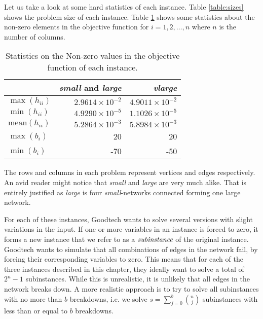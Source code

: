 Let us take a look at some hard statistics of each instance.
Table \ref{table:sizes} shows the problem size of each instance.
Table \ref{table:maxmin} shows some statistics about the non-zero elements in
the objective function for $i = 1,2,\ldots,n$ where $n$ is the number of
columns.
\begin{table}[h!]
    \centering
    \caption{Statistics on the Non-zero values in the objective function of
each instance.}

    \begin{tabular}{lrr}
      & \textit{small} and \textit{large}         & \textit{vlarge} \\\hline
    $\max(h_{ii})$      & $2.9614 \times 10^{-2}$ & $4.9011 \times 10^{-2}$ \\
    $\min(h_{ii})$      & $4.9290 \times 10^{-5}$ & $1.1026 \times 10^{-5}$ \\
$\textrm{mean}(h_{ii})$ & $5.2864 \times 10^{-3}$ & $5.8984 \times 10^{-3}$ \\
    $\max(b_{i})$       & 20                      & 20 \\
    $\min(b_{i})$       & -70                     & -50 \\
    \end{tabular}
    \label{table:maxmin}
\end{table}
The rows and columns in each problem represent vertices and edges respectively.
An avid reader might notice that \textit{small} and \textit{large} are very
much alike.
That is entirely justified as \textit{large} is four \textit{small}-networks
connected forming one large network.

For each of these instances, Goodtech wants to solve several versions
with slight variations in the input.
If one or more variables in an instance is forced to zero, it forms a new
instance that we refer to as a $\emph{subinstance}$ of the original instance.
Goodtech wants to simulate that all combinations of edges in the network
fail, by forcing their corresponding variables to zero.
This means that for each of the three instances described in this chapter,
they ideally want to solve a total of $2^n - 1$ subinstances. While this is
unrealistic, it is unlikely that all edges in the network breaks down.
A more realistic approach is to try to solve all subinstances with no more than
$b$ breakdowns, i.e. we solve $s = \sum_{j=0}^b {n \choose j}$ subinstances
with less than or equal to $b$ breakdowns.
